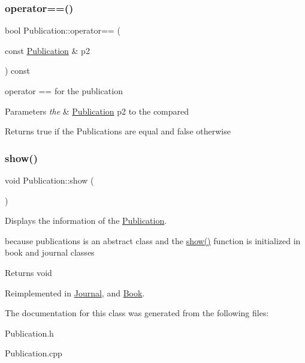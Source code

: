 \mbox{\label{class_publication_a60f079ac47aa4b8aa94957e15f12a2da}} 
\subsubsection{\texorpdfstring{operator==()}{operator==()}}
{\footnotesize\ttfamily bool Publication\+::operator== (\begin{DoxyParamCaption}\item[{const \hyperlink{class_publication}{Publication} \&}]{p2 }\end{DoxyParamCaption}) const}



operator == for the publication 


\begin{DoxyParams}{Parameters}
{\em the} & \hyperlink{class_publication}{Publication} p2 to the compared\\
\hline
\end{DoxyParams}
\begin{DoxyReturn}{Returns}
true if the Publications are equal and false otherwise 
\end{DoxyReturn}
\mbox{\label{class_publication_aa4240a04fcecd6257e0d1a33e8f18ff0}} 
\subsubsection{\texorpdfstring{show()}{show()}}
{\footnotesize\ttfamily void Publication\+::show (\begin{DoxyParamCaption}{ }\end{DoxyParamCaption})\hspace{0.3cm}{\ttfamily [virtual]}}



Displays the information of the \hyperlink{class_publication}{Publication}. 

because publications is an abstract class and the \hyperlink{class_publication_aa4240a04fcecd6257e0d1a33e8f18ff0}{show()} function is initialized in book and journal classes

\begin{DoxyReturn}{Returns}
void 
\end{DoxyReturn}


Reimplemented in \hyperlink{class_journal_a7131809f3865fbdcbba5f38996d29c7a}{Journal}, and \hyperlink{class_book_a8368f243d8a645444e8019760a50cc8b}{Book}.



The documentation for this class was generated from the following files\+:\begin{DoxyCompactItemize}
\item 
Publication.\+h\item 
Publication.\+cpp\end{DoxyCompactItemize}
